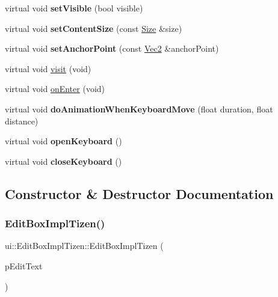 \begin{DoxyCompactItemize}
virtual void {\bfseries set\+Visible} (bool visible)
\item 
\mbox{\label{classui_1_1EditBoxImplTizen_aa669c8fff6ebd7e0be4e0885dd9fda06}} 
virtual void {\bfseries set\+Content\+Size} (const \hyperlink{classSize}{Size} \&size)
\item 
\mbox{\label{classui_1_1EditBoxImplTizen_a3649511e505635421f2241eed8eecfc9}} 
virtual void {\bfseries set\+Anchor\+Point} (const \hyperlink{classVec2}{Vec2} \&anchor\+Point)
\item 
virtual void \hyperlink{classui_1_1EditBoxImplTizen_a2a1062fc2957039abdf3b36c379530de}{visit} (void)
\item 
virtual void \hyperlink{classui_1_1EditBoxImplTizen_ac04445d2c58f2610e8c3e7ee6d68f5e5}{on\+Enter} (void)
\item 
\mbox{\label{classui_1_1EditBoxImplTizen_aef1d381875889ab5ca46f6b86dd45ecd}} 
virtual void {\bfseries do\+Animation\+When\+Keyboard\+Move} (float duration, float distance)
\item 
\mbox{\label{classui_1_1EditBoxImplTizen_a834b049d87d80530bd01af072e67daee}} 
virtual void {\bfseries open\+Keyboard} ()
\item 
\mbox{\label{classui_1_1EditBoxImplTizen_a0f149546248b89cd9f40e7cb1005bcaa}} 
virtual void {\bfseries close\+Keyboard} ()
\end{DoxyCompactItemize}


\subsection{Constructor \& Destructor Documentation}
\mbox{\label{classui_1_1EditBoxImplTizen_a4ec99ac2f65e3138baf2098c2713b111}} 
\subsubsection{\texorpdfstring{Edit\+Box\+Impl\+Tizen()}{EditBoxImplTizen()}\hspace{0.1cm}{\footnotesize\ttfamily [1/2]}}
{\footnotesize\ttfamily ui\+::\+Edit\+Box\+Impl\+Tizen\+::\+Edit\+Box\+Impl\+Tizen (\begin{DoxyParamCaption}\item[{\hyperlink{classui_1_1EditBox}{Edit\+Box} $\ast$}]{p\+Edit\+Text }\end{DoxyParamCaption})}

